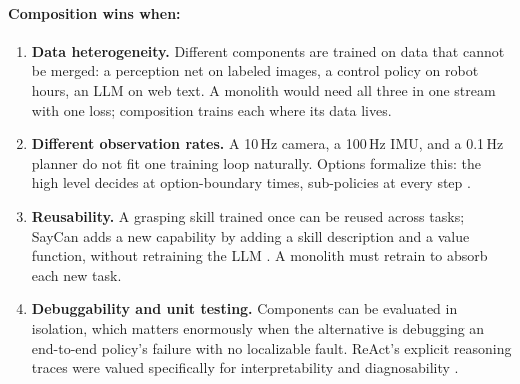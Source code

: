 \documentclass[11pt]{article}
\begin{document}
\paragraph{Composition wins when:}
\begin{enumerate}[noitemsep]
  \item \textbf{Data heterogeneity.} Different components are trained on data that cannot be merged: a perception net on labeled images, a control policy on robot hours, an LLM on web text. A monolith would need all three in one stream with one loss; composition trains each where its data lives.
  \item \textbf{Different observation rates.} A 10\,Hz camera, a 100\,Hz IMU, and a 0.1\,Hz planner do not fit one training loop naturally. Options formalize this: the high level decides at option-boundary times, sub-policies at every step \cite{sutton1999options}.
  \item \textbf{Reusability.} A grasping skill trained once can be reused across tasks; SayCan adds a new capability by adding a skill description and a value function, without retraining the LLM \cite{ahn2022saycan}. A monolith must retrain to absorb each new task.
  \item \textbf{Debuggability and unit testing.} Components can be evaluated in isolation, which matters enormously when the alternative is debugging an end-to-end policy's failure with no localizable fault. ReAct's explicit reasoning traces were valued specifically for interpretability and diagnosability \cite{yao2023react}.
\end{enumerate}
\end{document}

